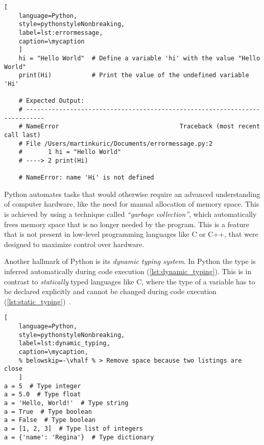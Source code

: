 \def\mycaption{Example of an error message. Since Python is case-sensitive, the
error is caused by misspelling the variable name \texttt{hi} as \texttt{Hi}.
The error message begins with the type of error (\texttt{NameError}),
followed by a traceback that shows the sequence of function calls that led
to the error. The traceback located the source of the error in the file
\texttt{errormessage.py} and points to the line that caused the error.
Finally, the error message explains the error, stating that \texttt{'Hi'} is
undefined. }
\begin{lstlisting}[
    language=Python, 
    style=pythonstyleNonbreaking,
    label=lst:errormessage,
    caption=\mycaption
    ]
    hi = "Hello World"  # Define a variable 'hi' with the value "Hello World"
    print(Hi)           # Print the value of the undefined variable 'Hi'
    
    # Expected Output:
    # ---------------------------------------------------------------------------
    # NameError                                 Traceback (most recent call last)
    # File /Users/martinkuric/Documents/errormessage.py:2
    #       1 hi = "Hello World"
    # ----> 2 print(Hi)
    
    # NameError: name 'Hi' is not defined
\end{lstlisting}


Python automates tasks that would otherwise require an advanced understanding of
computer hardware, like the need for manual allocation of memory space. This is
achieved by using a technique called \textit{``garbage collection''}, which
automatically frees memory space that is no longer needed by the program. This
is a feature that is not present in low-level programming languages like C or
C++, that were designed to maximize control over hardware.


Another hallmark of Python is its \textit{dynamic typing system}. In Python the
type is inferred automatically during code execution
(\autoref{lst:dynamic_typing}). This is in contrast to \textit{statically} typed
languages like C, where the type of a variable has to be declared explicitly and
cannot be changed during code execution
(\autoref{lst:static_typing})~\cite{PythonLanguageReference2024}.

\def\mycaption{ Example of dynamic typing in Python. The variable ``\texttt{a}''
    is assigned the value 5, which is of type integer. The variable
    ``\texttt{a}'' is then overwritten with the value ``\texttt{Hello,
        World!}'', which is of type string. Python allows dynamic re-assignment of
    variables with different types. Note that code after ``\texttt{\#}'' is
    considered a comment and won't be executed.}
\begin{lstlisting}[
    language=Python,
    style=pythonstyleNonbreaking,
    label=lst:dynamic_typing,
    caption=\mycaption,
    % belowskip=-\vhalf % > Remove space because two listings are close
    ]
a = 5  # Type integer
a = 5.0  # Type float
a = 'Hello, World!'  # Type string
a = True  # Type boolean
a = False  # Type boolean
a = [1, 2, 3]  # Type list of integers
a = {'name': 'Regina'}  # Type dictionary
\end{lstlisting}

